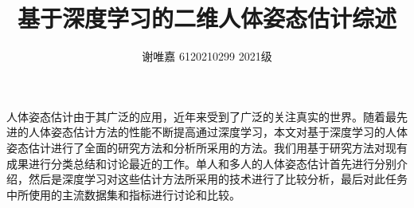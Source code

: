 \documentclass[hyperref]{ctexart}
\title{\textbf{基于深度学习的二维人体姿态估计综述}}
\author{谢唯嘉 6120210299 2021级}
\date{}
\begin{document}
	\maketitle
	\renewcommand\tablename{表}
	人体姿态估计由于其广泛的应用，近年来受到了广泛的关注真实的世界。随着最先进的人体姿态估计方法的性能不断提高通过深度学习，本文对基于深度学习的人体姿态估计进行了全面的研究方法和分析所采用的方法。我们用基于研究方法对现有成果进行分类总结和讨论最近的工作。单人和多人的人体姿态估计首先进行分别介绍，然后是深度学习对这些估计方法所采用的技术进行了比较分析，最后对此任务中所使用的主流数据集和指标进行讨论和比较。\\
	
\end{document}
